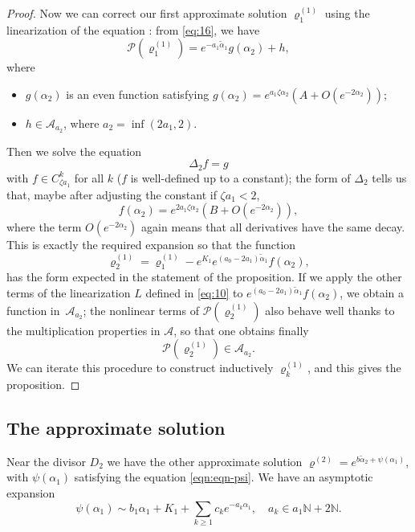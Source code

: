 \documentclass[10pt]{amsart}
\theoremstyle{plain}
\theoremstyle{definition}
\newcommand{\cA}{\mathcal{A}}
\newcommand{\ta}{\tilde \alpha}
\newcommand{\opP}{\mathcal{P}}
\newcommand{\rhodeux}{\varrho^{(2)}}
\newcommand{\rhoun}{\varrho^{(1)}}
\begin{document}
\begin{proof}
Now we can correct our first approximate solution $\rhoun_1$ using the linearization of the equation : from \eqref{eq:16}, we have
\[ \opP(\rhoun_1) = e^{-a_1\ta_1} g(\alpha_2) + h, \]
where
\begin{itemize}
\item $g(\alpha_2)$ is an even function satisfying $g(\alpha_2)=e^{a_1 \zeta \alpha_2} (A+O(e^{-2\alpha_2}))$;
\item $h\in \cA_{a_2}$, where $a_2=\inf(2a_1,2)$.
\end{itemize}
Then we solve the equation
\begin{equation}
\Delta_2f=g\label{eq:32}
\end{equation}
with $f\in C^k_{\zeta a_1}$ for all $k$ ($f$ is well-defined up to a constant); the form of $\Delta_2$ tells us that, maybe after adjusting the constant if $\zeta a_1<2$,
\begin{equation}
f(\alpha_2) = e^{2a_1 \zeta \alpha_2} (B+O(e^{-2\alpha_2})),\label{eq:33}
\end{equation}
where the term $O(e^{-2\alpha_2})$ again means that all derivatives have the same decay. This is exactly the required expansion so that the function
\begin{equation}
\rhoun_2 = \rhoun_1 - e^{K_1} e^{(a_0-2a_1)\ta_1} f(\alpha_2),
\end{equation}
has the form expected in the statement of the proposition. If we apply the other terms of the linearization $L$ defined in \eqref{eq:10} to $e^{(a_0-2a_1)\ta_1} f(\alpha_2)$, we obtain a function in~$\cA_{a_2}$; the nonlinear terms of $\opP(\rhoun_2)$ also behave well thanks to the multiplication properties in $\cA$, so that one obtains finally
\[ \opP(\rhoun_2) \in \cA_{a_2}. \]
We can iterate this procedure to construct inductively $\rhoun_k$, and this gives the proposition.
\end{proof}

\subsection{The approximate solution}
\label{sec:approximate-solution}

Near the divisor $D_2$ we have the other approximate solution $\rhodeux=e^{b\ta_2+\psi(\alpha_1)}$,
with $\psi(\alpha_1)$ satisfying the equation \eqref{eqn:eqn-psi}. We have an asymptotic expansion
\begin{equation}
\psi(\alpha_1) \sim b_1\alpha_1 + K_1 + \sum_{k\ge1} c_k e^{-a_k\alpha_1}, \quad a_k\in a_1\mathbb{N}+2\mathbb{N}.\label{eq:18}
\end{equation}
\end{document}
